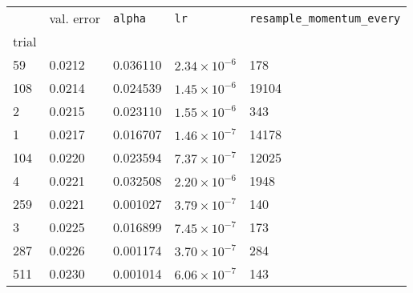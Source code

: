 \begin{tabular}{lp{2cm}p{2cm}p{2cm}p{2cm}}
\toprule
{} &  val. error &  \texttt{alpha} &         \texttt{lr} &  \texttt{resample\_momentum\_every} \\
trial &             &                 &                     &                                     \\
\midrule
59    &      0.0212 &        0.036110 & $2.34\times10^{-6}$ &                                 178 \\
108   &      0.0214 &        0.024539 & $1.45\times10^{-6}$ &                               19104 \\
2     &      0.0215 &        0.023110 & $1.55\times10^{-6}$ &                                 343 \\
1     &      0.0217 &        0.016707 & $1.46\times10^{-7}$ &                               14178 \\
104   &      0.0220 &        0.023594 & $7.37\times10^{-7}$ &                               12025 \\
4     &      0.0221 &        0.032508 & $2.20\times10^{-6}$ &                                1948 \\
259   &      0.0221 &        0.001027 & $3.79\times10^{-7}$ &                                 140 \\
3     &      0.0225 &        0.016899 & $7.45\times10^{-7}$ &                                 173 \\
287   &      0.0226 &        0.001174 & $3.70\times10^{-7}$ &                                 284 \\
511   &      0.0230 &        0.001014 & $6.06\times10^{-7}$ &                                 143 \\
\bottomrule
\end{tabular}
